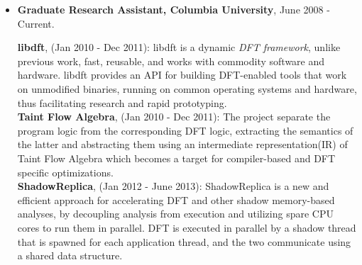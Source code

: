 \documentclass[10pt,a4]{article}
\begin{document}
\begin{small}
\begin{itemize}
  {\bf Application Community}, (Jan 2007 - Aug 2009): In this project, we
  leverage the software mono-culture to design and implement distributed
  security architecture that segments defense and protection responsibility
  across the large number of hosts connected via the Internet.
%  

\vspace{0.1cm}
\item  {\bf Graduate Research Assistant, Columbia University}, June 2008 - Current.

  {\bf libdft}, (Jan 2010 - Dec 2011): libdft is a dynamic {\it DFT framework},
  unlike previous work, fast, reusable, and works with commodity software and
  hardware. libdft provides an API for building DFT-enabled tools that work on
  unmodified binaries, running on common operating systems and hardware, thus
  facilitating research and rapid prototyping.\\

  {\bf Taint Flow Algebra}, (Jan 2010 - Dec 2011): The project separate the
  program logic from the corresponding DFT logic, extracting the semantics of
  the latter and abstracting them using an intermediate representation(IR) of
  Taint Flow Algebra which becomes a target for compiler-based and DFT specific
  optimizations. \\

  {\bf ShadowReplica}, (Jan 2012 - June 2013): ShadowReplica is a new and
  efficient approach for accelerating DFT and other shadow memory-based
  analyses, by decoupling analysis from execution and utilizing spare CPU cores
  to run them in parallel. DFT is executed in parallel by a shadow thread that
  is spawned for each application thread, and the two communicate using a
  shared data structure. \\
  


\end{itemize}
\end{small}
\end{document}

